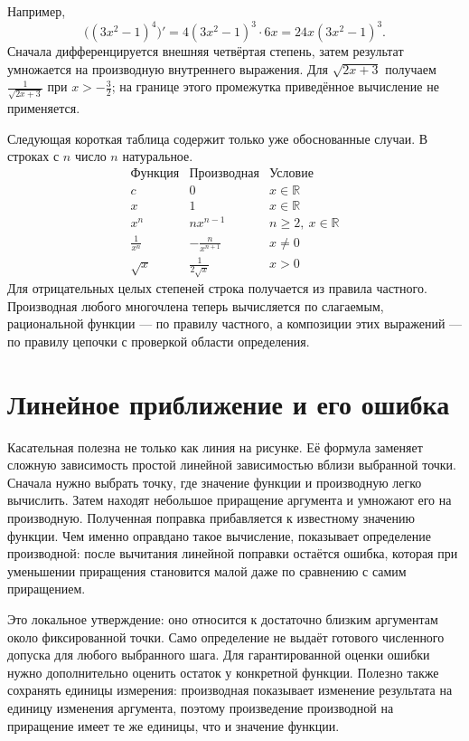Например,
\[
\bigl((3x^2-1)^4\bigr)'=4(3x^2-1)^3\cdot6x
=24x(3x^2-1)^3.
\]
Сначала дифференцируется внешняя четвёртая степень, затем результат умножается на производную внутреннего выражения. Для \(\sqrt{2x+3}\) получаем \(\frac1{\sqrt{2x+3}}\) при \(x>-\frac32\); на границе этого промежутка приведённое вычисление не применяется.

Следующая короткая таблица содержит только уже обоснованные случаи. В строках с \(n\) число \(n\) натуральное.
\[
\begin{array}{c|c|c}
\text{Функция}&\text{Производная}&\text{Условие}\\ \hline
c&0&x\in\mathbb R\\
x&1&x\in\mathbb R\\
x^n&nx^{n-1}&n\ge2,\ x\in\mathbb R\\
\frac1{x^n}&-\frac n{x^{n+1}}&x\ne0\\
\sqrt x&\frac1{2\sqrt x}&x>0
\end{array}
\]
Для отрицательных целых степеней строка получается из правила частного. Производная любого многочлена теперь вычисляется по слагаемым, рациональной функции --- по правилу частного, а композиции этих выражений --- по правилу цепочки с проверкой области определения.

\section{Линейное приближение и его ошибка}

Касательная полезна не только как линия на рисунке. Её формула заменяет сложную зависимость простой линейной зависимостью вблизи выбранной точки. Сначала нужно выбрать точку, где значение функции и производную легко вычислить. Затем находят небольшое приращение аргумента и умножают его на производную. Полученная поправка прибавляется к известному значению функции. Чем именно оправдано такое вычисление, показывает определение производной: после вычитания линейной поправки остаётся ошибка, которая при уменьшении приращения становится малой даже по сравнению с самим приращением.

Это локальное утверждение: оно относится к достаточно близким аргументам около фиксированной точки. Само определение не выдаёт готового численного допуска для любого выбранного шага. Для гарантированной оценки ошибки нужно дополнительно оценить остаток у конкретной функции. Полезно также сохранять единицы измерения: производная показывает изменение результата на единицу изменения аргумента, поэтому произведение производной на приращение имеет те же единицы, что и значение функции.

